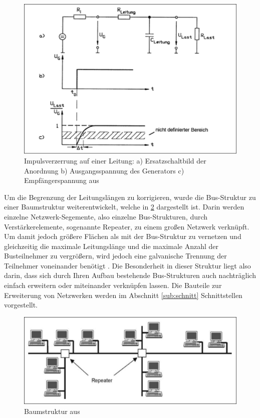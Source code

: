\begin{figure}
\centering
\includegraphics[width=\textwidth]{abbildungen/20160110_impulsbus}
\caption[Impulsverzerrung auf einer Leitung]{Impulsverzerrung auf einer Leitung: a) Ersatzschaltbild der Anordnung b) Ausgangsspannung des Generators c) Empfängerspannung aus \cite[S.~4]{schn06}}
\label{fig:bus_impuls}
\end{figure}

Um die Begrenzung der Leitungslängen zu korrigieren, wurde die Bus-Struktur zu einer Baumstruktur weiterentwickelt, welche in \ref{fig:baum_struktur} dargestellt ist. Darin werden einzelne Netzwerk-Segemente, also einzelne Bus-Strukturen, durch Verstärkerelemente, sogenannte  Repeater, zu einem großen Netzwerk verknüpft. Um damit jedoch größere Flächen als mit der Bus-Struktur zu vernetzen und gleichzeitig die maximale Leitungslänge und die maximale Anzahl der Busteilnehmer zu vergrößern, wird jedoch eine galvanische Trennung der Teilnehmer voneinander benötigt \cite[S.5~f.]{schn06}. Die Besonderheit in dieser Struktur liegt also darin, dass sich durch Ihren Aufbau bestehende Bus-Strukturen auch nachträglich einfach erweitern oder miteinander verknüpfen lassen. Die Bauteile zur Erweiterung von Netzwerken werden im Abschnitt \ref{sub:schnitt} Schnittstellen vorgestellt.

\begin{figure}
\centering
\includegraphics[width=\textwidth]{abbildungen/20160110_baumstruktur}
\caption[Baumstruktur]{Baumstruktur aus \cite[S.~5]{schn06}}
\label{fig:baum_struktur}
\end{figure}

